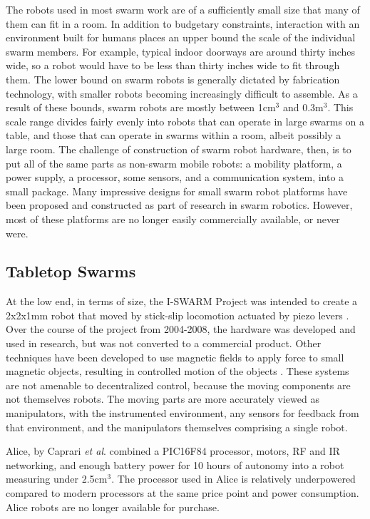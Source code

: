 The robots used in most swarm work are of a sufficiently small size that many of them can fit in a room. 
In addition to budgetary constraints, interaction with an environment built for humans places an upper bound the scale of the individual swarm members. 
For example, typical indoor doorways are around thirty inches wide, so a robot would have to be less than thirty inches wide to fit through them. 
The lower bound on swarm robots is generally dictated by fabrication technology, with smaller robots becoming increasingly difficult to assemble. 
As a result of these bounds, swarm robots are mostly between 1cm$^3$ and 0.3m$^3$. 
This scale range divides fairly evenly into robots that can operate in large swarms on a table, and those that can operate in swarms within a room, albeit possibly a large room. 
The challenge of construction of swarm robot hardware, then, is to put all of the same parts as non-swarm mobile robots: a mobility platform, a power supply, a processor, some sensors, and a communication system, into a small package.
Many impressive designs for small swarm robot platforms have been proposed and constructed as part of research in swarm robotics. 
However, most of these platforms are no longer easily commercially available, or never were. 

\subsection{Tabletop Swarms}

At the low end, in terms of size, the I-SWARM Project was intended to create a 2x2x1mm robot that moved by stick-slip locomotion actuated by piezo levers \citep{seyfried2005swarm}. 
Over the course of the project from 2004-2008, the hardware was developed and used in research, but was not converted to a commercial product.
Other techniques have been developed to use magnetic fields to apply force to small magnetic objects, resulting in controlled motion of the objects \citep{floyd2008untethered, pelrine2012diamagnetically}.
These systems are not amenable to decentralized control, because the moving components are not themselves robots. 
The moving parts are more accurately viewed as manipulators, with the instrumented environment, any sensors for feedback from that environment, and the manipulators themselves comprising a single robot. 

Alice, by Caprari \emph{et al}. \citep{caprari1998autonomous} combined a PIC16F84 processor, motors, RF and IR networking, and enough battery power for 10 hours of autonomy into a robot measuring under 2.5cm$^3$. 
The processor used in Alice is relatively underpowered compared to modern processors at the same price point and power consumption. 
Alice robots are no longer available for purchase. 



